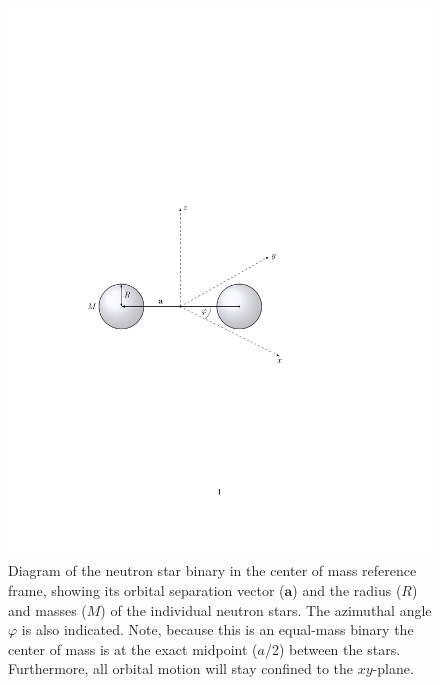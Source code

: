 \documentclass[11pt]{article}
\begin{document}
\begin{figure}[!h]
\begin{mdframed}
\centering
\includegraphics{keplerian_orbit/binary_diagram.pdf}
\caption{\label{fig:binary_diagram}Diagram of the neutron star binary in the center of mass reference frame, showing its orbital separation vector ($\mathbf{a}$) and the radius ($R$) and masses ($M$) of the individual neutron stars. The azimuthal angle $\varphi$ is also indicated. Note, because this is an equal-mass binary the center of mass is at the exact midpoint ($a$/2) between the stars. Furthermore, all orbital motion will stay confined to the $xy$-plane.}
\end{mdframed}
\end{figure}

\vspace{1000pt}
\end{document}
